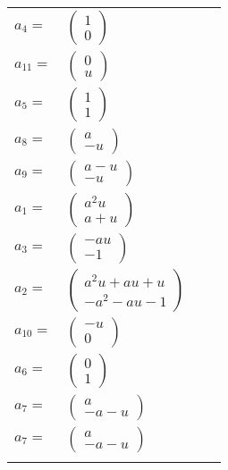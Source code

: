 \documentclass[1p]{elsarticle_modified}
\theoremstyle{definition}
\begin{document}
\begin{tabular}{m{7pt} m{180pt} m{7pt} m{180pt} }
\flushright $a_{4}=$&$\begin{pmatrix}1\\0\end{pmatrix}$ \\
\flushright $a_{11}=$&$\begin{pmatrix}0\\u\end{pmatrix}$ \\
\flushright $a_{5}=$&$\begin{pmatrix}1\\1\end{pmatrix}$ \\
\flushright $a_{8}=$&$\begin{pmatrix}a\\- u\end{pmatrix}$ \\
\flushright $a_{9}=$&$\begin{pmatrix}a- u\\- u\end{pmatrix}$ \\
\flushright $a_{1}=$&$\begin{pmatrix}a^2 u\\a+u\end{pmatrix}$ \\
\flushright $a_{3}=$&$\begin{pmatrix}- a u\\-1\end{pmatrix}$ \\
\flushright $a_{2}=$&$\begin{pmatrix}a^2 u+a u+u\\- a^2- a u-1\end{pmatrix}$ \\
\flushright $a_{10}=$&$\begin{pmatrix}- u\\0\end{pmatrix}$ \\
\flushright $a_{6}=$&$\begin{pmatrix}0\\1\end{pmatrix}$ \\
\flushright $a_{7}=$&$\begin{pmatrix}a\\- a- u\end{pmatrix}$\\ \flushright $a_{7}=$&$\begin{pmatrix}a\\- a- u\end{pmatrix}$\\&\end{tabular}
\end{document}
